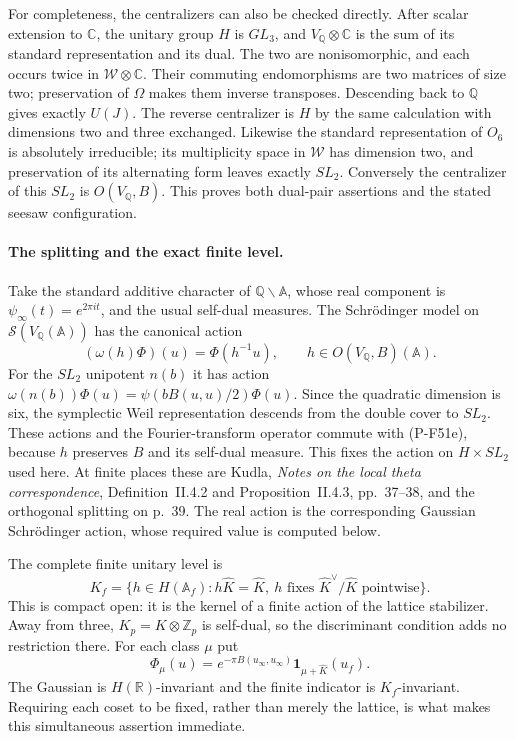 \documentclass[11pt,a4paper]{article}
\begin{document}
For completeness, the centralizers can also be checked
directly. After scalar extension to $\mathbb C$, the
unitary group $H$ is $GL_3$, and $V_{\mathbb Q}\otimes\mathbb C$
is the sum of its standard representation and its dual.
The two are nonisomorphic, and each occurs twice in
$\mathcal W\otimes\mathbb C$. Their commuting
endomorphisms are two matrices of size two; preservation
of $\Omega$ makes them inverse transposes. Descending
back to $\mathbb Q$ gives exactly $U(J)$.
The reverse centralizer is $H$ by the same calculation
with dimensions two and three exchanged. Likewise the
standard representation of $O_6$ is absolutely irreducible;
its multiplicity space in $\mathcal W$ has dimension two,
and preservation of its alternating form leaves exactly
$SL_2$. Conversely the centralizer of this $SL_2$ is
$O(V_{\mathbb Q},B)$. This proves both dual-pair assertions
and the stated seesaw configuration.

\paragraph{The splitting and the exact finite level.}
Take the standard additive character of
$\mathbb Q\backslash\mathbb A$, whose real component is
$\psi_\infty(t)=e^{2\pi it}$, and the usual self-dual
measures. The Schr\"odinger model on
$\mathcal S(V_{\mathbb Q}(\mathbb A))$ has the canonical
action
\[
        (\omega(h)\Phi)(u)=\Phi(h^{-1}u),
                   \qquad h\in O(V_{\mathbb Q},B)(\mathbb A).
 \tag{P-F51e}
\]
For the $SL_2$ unipotent $n(b)$ it has action
$\omega(n(b))\Phi(u)=\psi(bB(u,u)/2)\Phi(u)$.
Since the quadratic dimension is six, the symplectic
Weil representation descends from the double cover
to $SL_2$. These actions and the Fourier-transform
operator commute with (P-F51e), because $h$ preserves
$B$ and its self-dual measure. This fixes the action
on $H\times SL_2$ used here. At finite places these are
Kudla, \emph{Notes on the local theta correspondence},
Definition~II.4.2 and Proposition~II.4.3, pp.~37--38,
and the orthogonal splitting on p.~39. The real action
is the corresponding Gaussian Schr\"odinger action,
whose required value is computed below.

The complete finite unitary level is
\[
 K_f=\{h\in H(\mathbb A_f):h\widehat K=\widehat K,
                  \ h\text{ fixes }\widehat K^\vee/\widehat K
                          \text{ pointwise}\}.
 \tag{P-F51f}
\]
This is compact open: it is the kernel of a finite
action of the lattice stabilizer. Away from three,
$K_p=K\otimes\mathbb Z_p$ is self-dual, so the discriminant condition
adds no restriction there. For each class $\mu$ put
\[
 \Phi_\mu(u)=e^{-\pi B(u_\infty,u_\infty)}
                 \mathbf1_{\mu+\widehat K}(u_f).
 \tag{P-F51g}
\]
The Gaussian is $H(\mathbb R)$-invariant and the
finite indicator is $K_f$-invariant. Requiring each
coset to be fixed, rather than merely the lattice,
is what makes this simultaneous assertion immediate.
\end{document}
